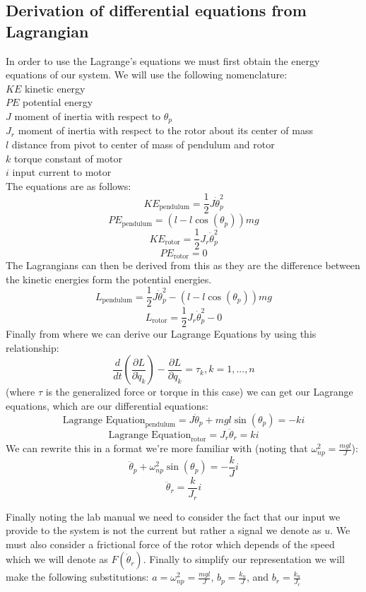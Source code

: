 \subsection{Derivation of differential equations from Lagrangian}
In order to use the Lagrange's equations we must first obtain the energy equations of our system. We will use the following nomenclature:\\
$KE$ kinetic energy\\
$PE$ potential energy\\
$J$ moment of inertia with respect to $\theta_p$\\
$J_r$ moment of inertia with respect to the rotor about its center of mass\\
$l$ distance from pivot to center of mass of pendulum and rotor\\
$k$ torque constant of motor\\
$i$ input current to motor\\
The equations are as follows:
$$KE_{\text{pendulum}} = \frac{1}{2}J\dot\theta_p^2$$
$$PE_{\text{pendulum}} = (l-l\cos(\theta_p))mg$$
$$KE_{\text{rotor}} = \frac{1}{2}J_r\dot\theta_p^2$$
$$PE_{\text{rotor}} = 0$$
The Lagrangians can then be derived from this as they are the difference between the kinetic energies form the potential energies.
$$L_{\text{pendulum}} = \frac{1}{2}J\dot\theta_p^2-(l-l\cos(\theta_p))mg$$
$$L_{\text{rotor}} = \frac{1}{2}J_r\dot\theta_p^2-0$$
Finally from where we can derive our Lagrange Equations by using this relationship:
$$\frac{d}{dt}\left(\frac{\partial L}{\partial\dot q_k}\right)-\frac{\partial L}{\partial q_k}=\tau_k, k = 1,...,n$$
(where $\tau$ is the generalized force or torque in this case) we can get our Lagrange equations, which are our differential equations:
$$\text{Lagrange Equation}_{\text{pendulum}} = J\ddot\theta_p+mgl\sin(\theta_p)=-ki$$
$$\text{Lagrange Equation}_{\text{rotor}} = J_r\ddot\theta_r=ki$$
We can rewrite this in a format we're more familiar with (noting that $\omega_{np}^2 = \frac{mgl}{J}$):
$$\ddot\theta_p+\omega_{np}^2\sin(\theta_p)=-\frac{k}{J}i$$
$$\ddot\theta_r=\frac{k}{J_r}i$$

Finally noting the lab manual we need to consider the fact that our input we provide to the system is not the current but rather a signal we denote as $u$. We must also consider a frictional force of the rotor which depends of the speed which we will denote as $F(\dot\theta_r)$. Finally to simplify our representation we will make the following substitutions: $a = \omega_{np}^2 = \frac{mgl}{J}$, $b_p = \frac{k_u}{J}$, and $b_r = \frac{k_u}{J_r}$

